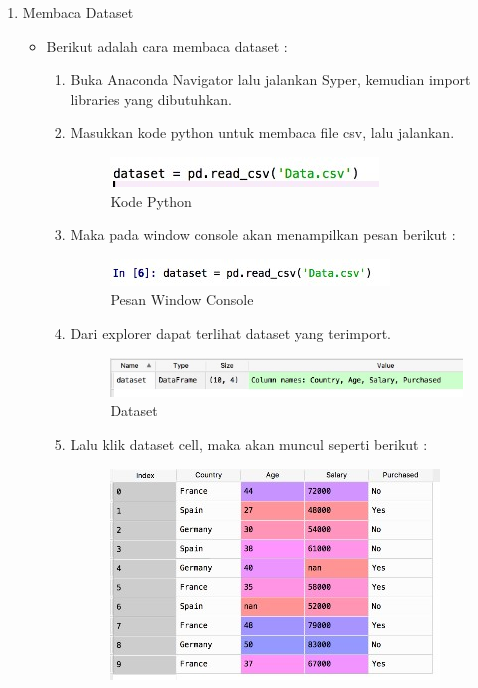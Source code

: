 \begin{enumerate}
\item Membaca Dataset
	\begin{itemize}
	\item Berikut adalah cara membaca dataset :
		\begin{enumerate}
			\item Buka Anaconda Navigator lalu jalankan Syper, kemudian import libraries yang dibutuhkan.
			\item Masukkan kode python untuk membaca file csv, lalu jalankan.
				\begin{figure}[ht]
				\centering
				\includegraphics[scale=0.8]{figures/j41.jpg}
				\caption{Kode Python}
				\label{contoh}
				\end{figure}
			\item Maka pada window console akan menampilkan pesan berikut :
				\begin{figure}[ht]
				\centering
				\includegraphics[scale=0.9]{figures/j42.jpg}
				\caption{Pesan Window Console}
				\label{contoh}
				\end{figure}
			\item Dari explorer dapat terlihat dataset yang terimport.
				\begin{figure}[ht]
				\centering
				\includegraphics[scale=0.6]{figures/j43.jpg}
				\caption{Dataset}
				\label{contoh}
				\end{figure}
			\item Lalu klik dataset cell, maka akan muncul seperti berikut :
				\begin{figure}[ht]
				\centering
				\includegraphics[scale=0.7]{figures/j44.jpg}

\end{figure}
\end{enumerate}
\end{itemize}
\end{enumerate}
